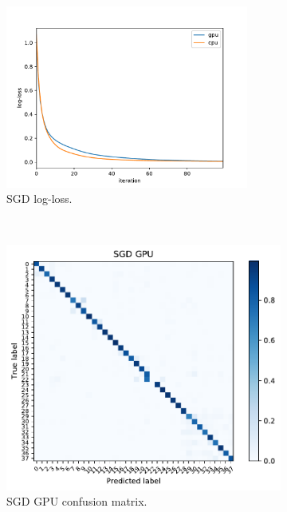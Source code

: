 \documentclass[conference]{IEEEtran}
\begin{document}
\begin{figure}
	\centering
	\begin{subfigure}[b]{.5\textwidth}
		\includegraphics[width=\textwidth,height=6cm]{results/sgd_losloss}
		\caption{SGD log-loss.}
		\label{fig:sgd_cpu_gpu}
	\end{subfigure}
	~ %
	\begin{subfigure}[b]{0.5\textwidth}
		\includegraphics[width=\textwidth]{results/plants_confusion_matrix_sgd_gpu}
		\caption{SGD GPU confusion matrix.}
		\label{fig:sgd_gpu_performance}
	\end{subfigure}
	~ %
	\begin{subfigure}[b]{0.5\textwidth}

\end{subfigure}
\end{figure}
\end{document}
